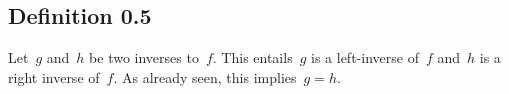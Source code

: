 \subsection{Definition 0.5}

Let~$g$ and~$h$ be two inverses to~$f$.
This entails~$g$ is a left-inverse of~$f$ and~$h$ is a right inverse of~$f$.
As already seen, this implies~$g = h$.
